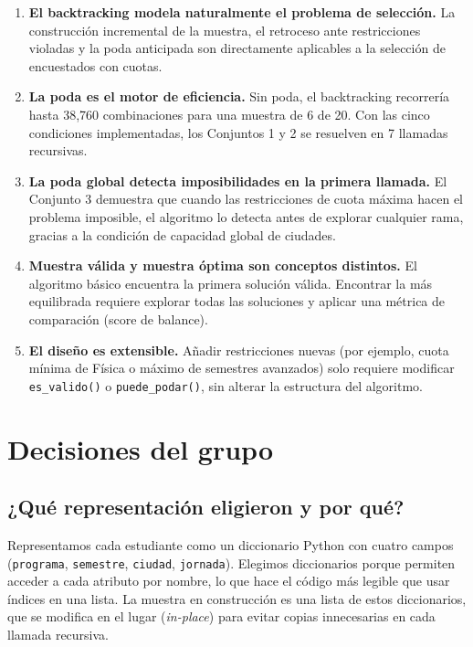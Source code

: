 \documentclass[12pt, a4paper]{article}
\begin{document}
\begin{enumerate}[noitemsep, leftmargin=*]
  \item \textbf{El backtracking modela naturalmente el problema de selección.} La construcción incremental de la muestra, el retroceso ante restricciones violadas y la poda anticipada son directamente aplicables a la selección de encuestados con cuotas.

  \item \textbf{La poda es el motor de eficiencia.} Sin poda, el backtracking recorrería hasta 38,760 combinaciones para una muestra de 6 de 20. Con las cinco condiciones implementadas, los Conjuntos 1 y 2 se resuelven en 7 llamadas recursivas.

  \item \textbf{La poda global detecta imposibilidades en la primera llamada.} El Conjunto 3 demuestra que cuando las restricciones de cuota máxima hacen el problema imposible, el algoritmo lo detecta antes de explorar cualquier rama, gracias a la condición de capacidad global de ciudades.

  \item \textbf{Muestra válida y muestra óptima son conceptos distintos.} El algoritmo básico encuentra la primera solución válida. Encontrar la más equilibrada requiere explorar todas las soluciones y aplicar una métrica de comparación (score de balance).

  \item \textbf{El diseño es extensible.} Añadir restricciones nuevas (por ejemplo, cuota mínima de Física o máximo de semestres avanzados) solo requiere modificar \texttt{es\_valido()} o \texttt{puede\_podar()}, sin alterar la estructura del algoritmo.
\end{enumerate}

\section{Decisiones del grupo}

\subsection*{¿Qué representación eligieron y por qué?}
Representamos cada estudiante como un diccionario Python con cuatro campos (\texttt{programa}, \texttt{semestre}, \texttt{ciudad}, \texttt{jornada}). Elegimos diccionarios porque permiten acceder a cada atributo por nombre, lo que hace el código más legible que usar índices en una lista. La muestra en construcción es una lista de estos diccionarios, que se modifica en el lugar (\emph{in-place}) para evitar copias innecesarias en cada llamada recursiva.
\end{document}
